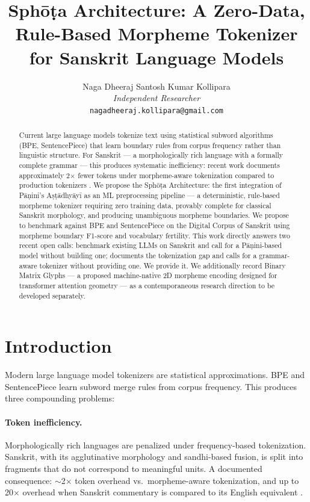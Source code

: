 \documentclass[11pt]{article}
\title{Sph\=o\d{t}a Architecture: A Zero-Data, Rule-Based Morpheme Tokenizer\\
for Sanskrit Language Models}
\author{Naga Dheeraj Santosh Kumar Kollipara \\
\textit{Independent Researcher} \\
\texttt{nagadheeraj.kollipara@gmail.com}}
\date{}
\begin{document}
\maketitle

\begin{abstract}
Current large language models tokenize text using statistical subword algorithms (BPE, SentencePiece) that learn boundary rules from corpus frequency rather than linguistic structure. For Sanskrit --- a morphologically rich language with a formally complete grammar --- this produces systematic inefficiency: recent work documents approximately 2$\times$ fewer tokens under morpheme-aware tokenization compared to production tokenizers \citep{kumar2026}. We propose the Sph\=o\d{t}a Architecture: the first integration of P\={a}\d{n}ini's A\d{s}\d{t}\={a}dhy\={a}y\={i} as an ML preprocessing pipeline --- a deterministic, rule-based morpheme tokenizer requiring zero training data, provably complete for classical Sanskrit morphology, and producing unambiguous morpheme boundaries. We propose to benchmark against BPE and SentencePiece on the Digital Corpus of Sanskrit using morpheme boundary F1-score and vocabulary fertility. This work directly answers two recent open calls: \citet{srikant2025} benchmark existing LLMs on Sanskrit and call for a P\={a}\d{n}ini-based model without building one; \citet{kumar2026} documents the tokenization gap and calls for a grammar-aware tokenizer without providing one. We provide it. We additionally record Binary Matrix Glyphs --- a proposed machine-native 2D morpheme encoding designed for transformer attention geometry --- as a contemporaneous research direction to be developed separately.
\end{abstract}

\section{Introduction}

Modern large language model tokenizers are statistical approximations. BPE \citep{sennrich2016} and SentencePiece \citep{kudo2018} learn subword merge rules from corpus frequency. This produces three compounding problems:

\paragraph{Token inefficiency.} Morphologically rich languages are penalized under frequency-based tokenization. Sanskrit, with its agglutinative morphology and sandhi-based fusion, is split into fragments that do not correspond to meaningful units. A documented consequence: $\sim$2$\times$ token overhead vs.\ morpheme-aware tokenization, and up to 20$\times$ overhead when Sanskrit commentary is compared to its English equivalent \citep{kumar2026}.
\end{document}
